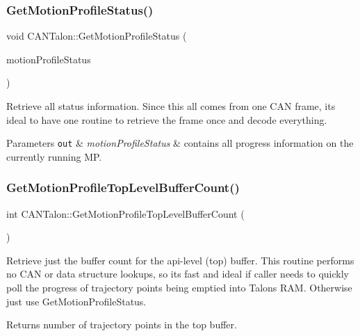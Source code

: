 \subsubsection{\texorpdfstring{Get\+Motion\+Profile\+Status()}{GetMotionProfileStatus()}}
{\footnotesize\ttfamily void C\+A\+N\+Talon\+::\+Get\+Motion\+Profile\+Status (\begin{DoxyParamCaption}\item[{\hyperlink{struct_c_a_n_talon_1_1_motion_profile_status}{Motion\+Profile\+Status} \&}]{motion\+Profile\+Status }\end{DoxyParamCaption})}

Retrieve all status information. Since this all comes from one C\+AN frame, its ideal to have one routine to retrieve the frame once and decode everything. 
\begin{DoxyParams}[1]{Parameters}
\mbox{\tt out}  & {\em motion\+Profile\+Status} & contains all progress information on the currently running MP. \\
\hline
\end{DoxyParams}
\mbox{\label{class_c_a_n_talon_a228e78ebfb9d4947fcf2e075791fac21}} 
\subsubsection{\texorpdfstring{Get\+Motion\+Profile\+Top\+Level\+Buffer\+Count()}{GetMotionProfileTopLevelBufferCount()}}
{\footnotesize\ttfamily int C\+A\+N\+Talon\+::\+Get\+Motion\+Profile\+Top\+Level\+Buffer\+Count (\begin{DoxyParamCaption}{ }\end{DoxyParamCaption})}

Retrieve just the buffer count for the api-\/level (top) buffer. This routine performs no C\+AN or data structure lookups, so its fast and ideal if caller needs to quickly poll the progress of trajectory points being emptied into Talon\textquotesingle{}s R\+AM. Otherwise just use Get\+Motion\+Profile\+Status. \begin{DoxyReturn}{Returns}
number of trajectory points in the top buffer. 
\end{DoxyReturn}
\mbox{\label{class_c_a_n_talon_a5f1fab77ecc45fc719a2a0886e0b3a4e}} 
